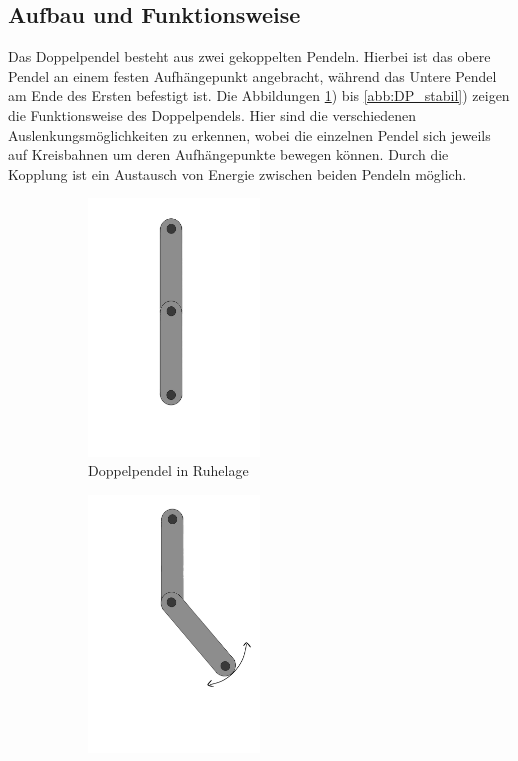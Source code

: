 \documentclass[11pt,a4paper,titlepage, ngerman]{article}
\begin{document}
		\subsection{Aufbau und Funktionsweise}	
			
			Das Doppelpendel besteht aus zwei gekoppelten Pendeln. Hierbei ist das obere Pendel an einem festen Aufhängepunkt angebracht, während das Untere Pendel am Ende des Ersten befestigt ist. Die Abbildungen \ref{abb:DP_Ruhe}) bis \ref{abb:DP_stabil}) zeigen die Funktionsweise des Doppelpendels. Hier sind die verschiedenen Auslenkungsmöglichkeiten zu erkennen, wobei die einzelnen Pendel sich jeweils auf Kreisbahnen um deren Aufhängepunkte bewegen können. Durch die Kopplung ist ein Austausch von Energie zwischen beiden Pendeln möglich.
			\begin{figure}[ht]
				\begin{subfigure}{0.5\textwidth}
					\centering
					\includegraphics[width=0.5\textwidth]{Doppelpendel_Ruhelage.png}
					\caption{Doppelpendel in Ruhelage}
					\label{abb:DP_Ruhe}	
				\end{subfigure}
				\begin{subfigure}{0.5\textwidth}
					\centering
					\includegraphics[width=0.5\textwidth]{Doppelpendel_Auslenkung_P2.png}

\end{subfigure}
\end{figure}
\end{document}
